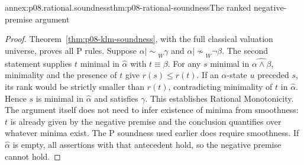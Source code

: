 \begin{annexitem}{annex:p08.rational.soundness}{thm:p08-rational-soundness}{The ranked negative-premise argument}
\begin{proof}
Theorem~\ref{thm:p08-klm-soundness}, with the full classical valuation
universe, proves all P rules. Suppose
\(\alpha\mathrel{|\!\sim}_W\gamma\) and
\(\alpha\mathrel{|\!\not\sim}_W\neg\beta\).
The second statement supplies \(t\) minimal in
\(\widehat\alpha\) with \(t\equiv\beta\).
For any \(s\) minimal in \(\widehat{\alpha\wedge\beta}\),
minimality and the presence of \(t\) give \(r(s)\leq r(t)\).
If an \(\alpha\)-state \(u\) preceded \(s\), its rank
would be strictly smaller than \(r(t)\), contradicting minimality
of \(t\) in \(\widehat\alpha\). Hence \(s\) is minimal
in \(\widehat\alpha\) and satisfies \(\gamma\).
This establishes Rational Monotonicity. The argument itself does not
need to infer existence of minima from smoothness: \(t\) is already
given by the negative premise and the conclusion quantifies over
whatever minima exist. The P soundness used earlier does require
smoothness. If \(\widehat\alpha\) is empty, all assertions with
that antecedent hold, so the negative premise cannot hold.
\end{proof}
\end{annexitem}

